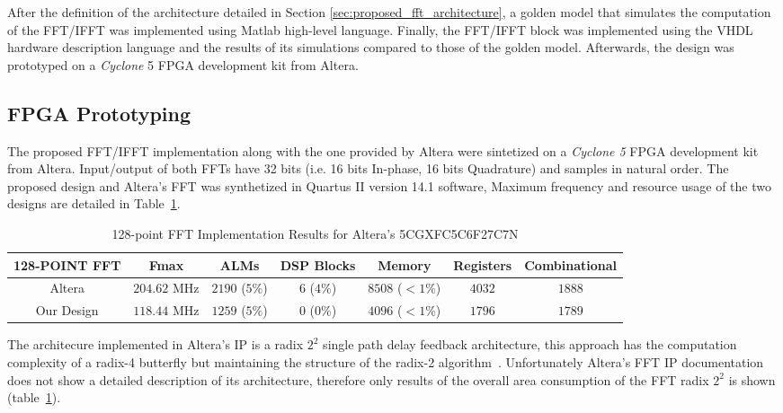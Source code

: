 After the definition of the architecture detailed in Section \ref{sec:proposed_fft_architecture}, a golden model that simulates the computation of the FFT/IFFT was implemented using Matlab high-level language. 
Finally, the FFT/IFFT block was implemented using the VHDL 
hardware description language and the results of its simulations compared to 
those of the golden model. Afterwards, the design was prototyped on a 
\textit{Cyclone} 5 FPGA development kit from Altera.

\subsection{FPGA Prototyping}

The proposed FFT/IFFT implementation along with the one provided by Altera were 
sintetized on a \textit{Cyclone 5} FPGA development kit from Altera. %
Input/output of both FFTs have 32 bits (i.e. 16 bits In-phase, 16 bits 
Quadrature) and samples in natural order. The proposed design and Altera's FFT was synthetized in Quartus II version 14.1 software, Maximum frequency and resource usage  of the two designs are detailed in Table~\ref{table:results_fpga_fft}.

\begin{table}[htb!]\footnotesize
\caption{128-point FFT Implementation Results for  Altera's 5CGXFC5C6F27C7N }
\label{table:results_fpga_fft}
\centering
\begin{tabular}{c c c c c c c}
\hline
\textbf{128-POINT FFT}&	\textbf{Fmax} &	\textbf{ALMs} &	\textbf{DSP Blocks} &	\textbf{Memory}&	\textbf{Registers} & \textbf{Combinational}\\
\hline
Altera       & $204.62$ MHz  & $2190$ ($5\%$) & $6$ ($4\%$) & $8508$ ($<1\%$) & $4032$  & $1888$ \\ 
Our Design   & $ 118.44$ MHz  & $1259$ ($5\%$) & $0$ ($0\%$) & $4096$ ($<1\%$) & $1796$  & $1789$ \\
\hline
\end{tabular}
\end{table}

The architecure implemented in Altera's IP is a radix $2^2$ single path delay feedback architecture, this approach has the computation complexity of a radix-4 butterfly but maintaining the structure of the radix-2 algorithm~\cite{radix22_fft_torkelson}. Unfortunately Altera's FFT IP documentation does not show a detailed description of its architecture, therefore only results of the overall area consumption of the FFT radix $2^2$ is shown (table~\ref{table:results_fpga_fft}).


